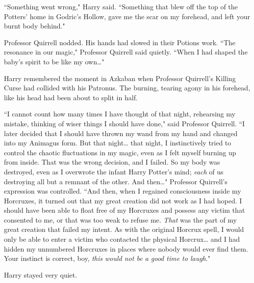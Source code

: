 ``Something went wrong," Harry said. ``Something that blew off the top of the Potters' home in Godric's Hollow, gave me the scar on my forehead, and left your burnt body behind."

Professor Quirrell nodded. His hands had slowed in their Potions work. ``The resonance in our magic," Professor Quirrell said quietly. ``When I had shaped the baby's spirit to be like my own{\ldots}"

Harry remembered the moment in Azkaban when Professor Quirrell's Killing Curse had collided with his Patronus. The burning, tearing agony in his forehead, like his head had been about to split in half.

``I cannot count how many times I have thought of that night, rehearsing my mistake, thinking of wiser things I should have done," said Professor Quirrell. ``I later decided that I should have thrown my wand from my hand and changed into my Animagus form. But that night{\ldots} that night, I instinctively tried to control the chaotic fluctuations in my magic, even as I felt myself burning up from inside. That was the wrong decision, and I failed. So my body was destroyed, even as I overwrote the infant Harry Potter's mind; \emph{each} of us destroying all but a remnant of the other. And then{\ldots}" Professor Quirrell's expression was controlled. ``And then, when I regained consciousness inside my Horcruxes, it turned out that my great creation did not work as I had hoped. I should have been able to float free of my Horcruxes and possess any victim that consented to me, or that was too weak to refuse me. \emph{That} was the part of my great creation that failed my intent. As with the original Horcrux spell, I would only be able to enter a victim who contacted the physical Horcrux{\ldots} and I had hidden my unnumbered Horcruxes in places where nobody would ever find them. Your instinct is correct, boy, \emph{this would not be a good time to laugh}."

Harry stayed very quiet.

